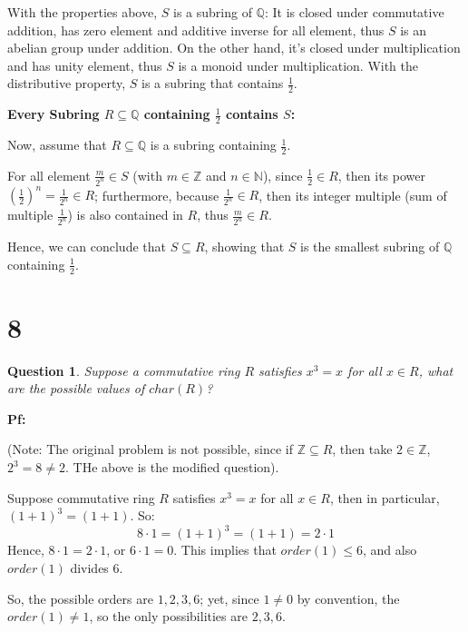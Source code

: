 \documentclass{article}
\newtheorem{question}{Question}
\begin{document}
With the properties above, $S$ is a subring of $\mathbb{Q}$:
It is closed under commutative addition, has zero element and additive inverse for all element, thus $S$ is an abelian group under addition.
On the other hand, it's closed under multiplication and has unity element, thus $S$ is a monoid under multiplication.
With the distributive property, $S$ is a subring that contains $\frac{1}{2}$.

\hfill

\textbf{Every Subring $R\subseteq \mathbb{Q}$ containing $\frac{1}{2}$ contains $S$:}

Now, assume that $R\subseteq \mathbb{Q}$ is a subring containing $\frac{1}{2}$.

For all element $\frac{m}{2^n}\in S$ (with $m\in\mathbb{Z}$ and $n\in\mathbb{N}$), since $\frac{1}{2}\in R$, then its power $(\frac{1}{2})^n = \frac{1}{2^n}\in R$;
furthermore, because $\frac{1}{2^n}\in R$, then its integer multiple (sum of multiple $\frac{1}{2^n}$) is also contained in $R$, thus $\frac{m}{2^n}\in R$.

Hence, we can conclude that $S\subseteq R$, showing that $S$ is the smallest subring of $\mathbb{Q}$ containing $\frac{1}{2}$.

\break


\section*{8}
\begin{myBox}[]{}
    \begin{question}
        Suppose a commutative ring $R$ satisfies $x^3=x$ for all $x\in R$, what are the possible values of $char(R)$?
    \end{question}
\end{myBox}

\textbf{Pf:}

(Note: The original problem is not possible, since if $\mathbb{Z}\subseteq R$, then take $2\in \mathbb{Z}$, $2^3=8\neq 2$. THe above is the modified question).

\hfill

Suppose commutative ring $R$ satisfies $x^3=x$ for all $x\in R$, then in particular, $(1+1)^3 = (1+1)$. So:
$$8\cdot 1 = (1+1)^3 = (1+1)=2\cdot 1$$ 
Hence, $8\cdot 1 = 2\cdot 1$, or $6\cdot 1 = 0$. This implies that $order(1) \leq 6$, and also $order(1)$ divides 6.

So, the possible orders are $1,2,3,6$; yet, since $1\neq 0$ by convention, the $order(1)\neq 1$, so the only possibilities are $2,3,6$.
\end{document}
